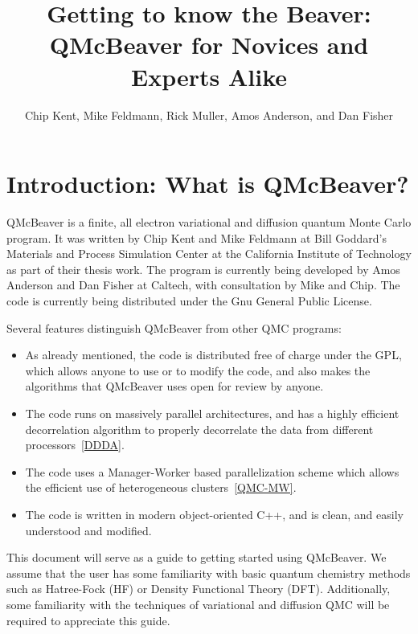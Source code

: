 \documentclass{article}
\begin{document}
\title{Getting to know the Beaver: QMcBeaver for Novices and Experts
  Alike}
\author{Chip Kent, Mike Feldmann, Rick Muller, Amos Anderson, and Dan Fisher}
\maketitle

\section{Introduction: What is QMcBeaver?}
QMcBeaver is a finite, all electron variational and diffusion quantum
Monte Carlo program.  It was written by Chip Kent and Mike Feldmann at
Bill Goddard's Materials and Process Simulation Center at the
California Institute of Technology as part of their thesis work. The
program is currently being developed by Amos Anderson and Dan Fisher
at Caltech, with consultation by Mike and Chip. The code is currently
being distributed under the Gnu General Public License.

Several features distinguish QMcBeaver from other QMC programs:
\begin{itemize}
\item As already mentioned, the code is distributed free of charge
  under the GPL, which allows anyone to use or to modify the code, and
  also makes the algorithms that QMcBeaver uses open for review by
  anyone.
\item The code runs on massively parallel architectures, and has a
  highly efficient decorrelation algorithm to properly decorrelate the
  data from different processors~\ref{DDDA}.
\item The code uses a Manager-Worker based parallelization scheme
  which allows the efficient use of heterogeneous clusters~\ref{QMC-MW}.
\item The code is written in modern object-oriented C++, and is clean,
  and easily understood and modified.


\end{itemize}

This document will serve as a guide to getting started using
QMcBeaver. We assume that the user has some familiarity with basic
quantum chemistry methods such as Hatree-Fock (HF) or Density
Functional Theory (DFT). Additionally, some familiarity with the
techniques of variational and diffusion QMC will be required to
appreciate this guide.
\end{document}
